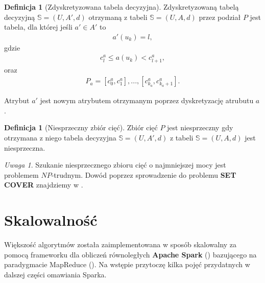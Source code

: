 \documentclass[magisterska]{pracamgr}
\theoremstyle{plain}
\theoremstyle{definition}
\newtheorem{definicja}[thm]{Definicja}
\theoremstyle{remark}
\newtheorem{uwaga}[thm]{Uwaga}
\begin{document}
\begin{definicja}[Zdyskretyzowana tabela decyzyjna]
 Zdyskretyzowaną tabelą decyzyjną $\mathbb{S} =(U, A', d)$ otrzymaną z tabeli $\mathbb{S} =(U, A, d)$ przez podział
 $P$ jest tabela, dla której jeśli $a' \in A'$ to
 \begin{align*}
     a'(u_k) = l,
  \end{align*}
  gdzie 
  \begin{align*}
   c_{l}^{a} \leq a(u_k) < c_{l+1}^{a},
  \end{align*}
  oraz
  \begin{align*}
     P_{a} = {[c_{0}^{a}, c_{1}^{a}], ... , [c_{k_{a}}^{a}, c_{k_{a} + 1}^{a}]}.
  \end{align*}
\end{definicja}
Atrybut $a'$ jest nowym atrybutem otrzymanym poprzez dyskretyzację atrubutu $a$.

\begin{definicja}[Niesprzeczny zbiór cięć]
 Zbiór cięć $P$ jest niesprzeczny gdy otrzymana z niego tabela decyzyjna $\mathbb{S} =(U, A', d)$ z tabeli $\mathbb{S} =(U, A, d)$
 jest niesprzeczna.
\end{definicja}

\begin{uwaga}
Szukanie niesprzecznego zbioru cięć o najmniejszej mocy jest problemem $NP$-trudnym.
Dowód poprzez sprowadzenie do problemu \textbf{SET COVER} znajdziemy w \cite{Discretization}.
\end{uwaga}


\chapter{Skalowalność}\label{r:skalowalnosc}

Większość algorytmów została zaimplementowana w sposób skalowalny za pomocą frameworku 
dla obliczeń równoległych \textbf{Apache Spark} (\cite{SparkDocumentation}) bazującego na paradygmacie MapReduce (\cite{MapReduce}).
Na wstępie przytoczę kilka pojęć przydatnych w dalszej części omawiania Sparka.
\end{document}

